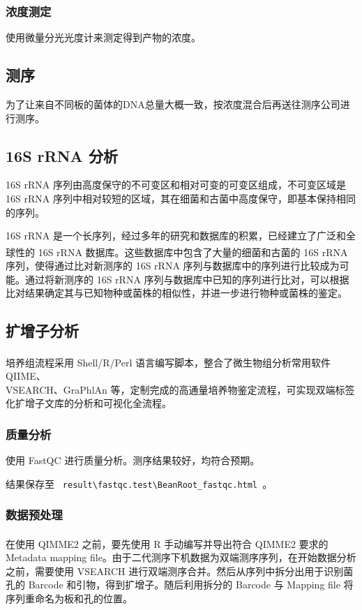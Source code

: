 \documentclass[UTF8]{ctexart}
\begin{document}
    \subsubsection{浓度测定}
    使用微量分光光度计来测定得到产物的浓度。

    \subsection{测序}
    为了让来自不同板的菌体的DNA总量大概一致，按浓度混合后再送往测序公司进行测序。

    \subsection{16S rRNA 分析}
    16S rRNA 序列由高度保守的不可变区和相对可变的可变区组成，不可变区域是 16S rRNA 序列中相对较短的区域，其在细菌和古菌中高度保守，即基本保持相同的序列。
    
    16S rRNA 是一个长序列，经过多年的研究和数据库的积累，已经建立了广泛和全球性的 16S rRNA 数据库\textsuperscript{\cite{ref3}}。这些数据库中包含了大量的细菌和古菌的 16S rRNA 序列，使得通过比对新测序的 16S rRNA 序列与数据库中的序列进行比较成为可能。通过将新测序的 16S rRNA 序列与数据库中已知的序列进行比对，可以根据比对结果确定其与已知物种或菌株的相似性，并进一步进行物种或菌株的鉴定。

    \subsection{扩增子分析}
    培养组流程\textsuperscript{\cite{ref4}}采用 Shell/R/Perl 语言编写脚本，整合了微生物组分析常用软件 QIIME、\\VSEARCH、GraPhlAn 等，定制完成的高通量培养物鉴定流程，可实现双端标签化扩增子文库的分析和可视化全流程。

    \subsubsection{质量分析}
    使用 FastQC 进行质量分析。测序结果较好，均符合预期。

    结果保存至 \verb| result\fastqc.test\BeanRoot_fastqc.html |。

    \subsubsection{数据预处理}
    在使用 QIMME2 之前，要先使用 R 手动编写并导出符合 QIMME2 要求\textsuperscript{\cite{ref5}}的 Metadata mapping file。由于二代测序下机数据为双端测序序列，在开始数据分析之前，需要使用 VSEARCH 进行双端测序合并。然后从序列中拆分出用于识别菌孔的 Barcode 和引物，得到扩增子。随后利用拆分的 Barcode 与 Mapping file 将序列重命名为板和孔的位置。
\end{document}
